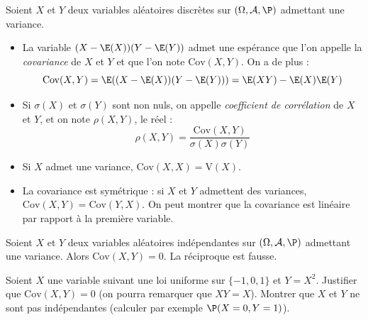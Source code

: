 \documentclass[french,11pt,twoside]{VcCours}
\begin{document}
\begin{Demonstration}{}
\vspace{3cm}
\end{Demonstration}


\begin{TheoremeDefinition}{} 
Soient $X$ et $Y$ deux variables aléatoires discrètes sur $(\Omega, \mathcal{A}, \P)$ admettant une variance.
\begin{itemize}
\item La variable $(X-\E(X))(Y-\E(Y))$ admet une espérance que l'on appelle la \emph{covariance} de $X$ et $Y$ et que l'on note $\textrm{Cov}(X,Y)$. On a de plus :
$$ \textrm{Cov}(X,Y) = \E((X-\E(X))(Y-\E(Y))) = \E(XY) - \E(X)\E(Y)$$
\item Si $\sigma(X)$ et $\sigma(Y)$ sont non nuls, on appelle \emph{coefficient de corrélation} de $X$ et $Y$, et on note $\rho(X,Y)$, le réel :
$$ \rho(X,Y) = \dfrac{\textrm{Cov}(X,Y)}{\sigma(X) \sigma(Y)}$$
\end{itemize}
\end{TheoremeDefinition}{}

\begin{Demonstration}{}
\vspace{6cm}
\end{Demonstration}

\begin{Remarques}{}
\begin{itemize}
\item Si $X$ admet une variance, $\textrm{Cov}(X,X)= \textrm{V}(X)$.
\item La covariance est symétrique : si $X$ et $Y$ admettent des variances, $\textrm{Cov}(X,Y) = \textrm{Cov}(Y,X)$. On peut montrer que la covariance est linéaire par rapport à la première variable.
\end{itemize}
\end{Remarques}

\begin{Proposition}{} Soient $X$ et $Y$ deux variables aléatoires indépendantes sur $(\Omega, \mathcal{A}, \P)$ admettant une variance. Alors $\textrm{Cov}(X,Y)=0$. La réciproque est fausse.
\end{Proposition}

\begin{Demonstration}{}

\vspace{1cm}
\end{Demonstration}

\begin{ApplicationDirecte}{} Soient $X$ une variable suivant une loi uniforme sur $\lbrace -1,0,1 \rbrace$ et $Y=X^2$. Justifier que $\textrm{Cov}(X,Y)=0$ (on pourra remarquer que $XY=X$). Montrer que $X$ et $Y$ ne sont pas indépendantes (calculer par exemple $\P(X=0, Y=1)$).
\end{ApplicationDirecte}
\end{document}
